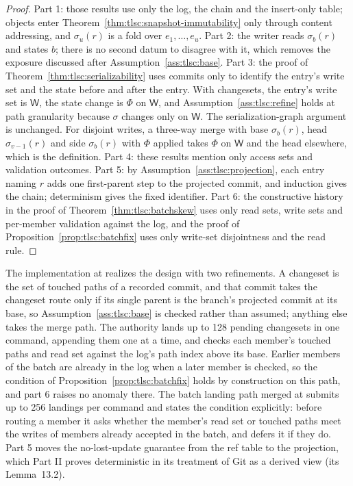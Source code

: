\documentclass[11pt,letterpaper]{article}
\theoremstyle{definition}
\theoremstyle{remark}
\newcommand{\W}{\mathsf{W}}
\begin{document}
\begin{proof}
Part 1: those results use only the log, the chain and the insert-only table; objects enter Theorem~\ref{thm:tlsc:snapshot-immutability} only through content addressing, and $\sigma_u(r)$ is a fold over $e_1,\dots,e_u$. Part 2: the writer reads $\sigma_b(r)$ and states $b$; there is no second datum to disagree with it, which removes the exposure discussed after Assumption~\ref{ass:tlsc:base}. Part 3: the proof of Theorem~\ref{thm:tlsc:serializability} uses commits only to identify the entry's write set and the state before and after the entry. With changesets, the entry's write set is $\W$, the state change is $\Phi$ on $\W$, and Assumption~\ref{ass:tlsc:refine} holds at path granularity because $\sigma$ changes only on $\W$. The serialization-graph argument is unchanged. For disjoint writes, a three-way merge with base $\sigma_b(r)$, head $\sigma_{v-1}(r)$ and side $\sigma_b(r)$ with $\Phi$ applied takes $\Phi$ on $\W$ and the head elsewhere, which is the definition. Part 4: these results mention only access sets and validation outcomes. Part 5: by Assumption~\ref{ass:tlsc:projection}, each entry naming $r$ adds one first-parent step to the projected commit, and induction gives the chain; determinism gives the fixed identifier. Part 6: the constructive history in the proof of Theorem~\ref{thm:tlsc:batchskew} uses only read sets, write sets and per-member validation against the log, and the proof of Proposition~\ref{prop:tlsc:batchfix} uses only write-set disjointness and the read rule.
\end{proof}

The implementation at  realizes the design with two refinements. A changeset is the set of touched paths of a recorded commit, and that commit takes the changeset route only if its single parent is the branch's projected commit at its base, so Assumption~\ref{ass:tlsc:base} is checked rather than assumed; anything else takes the merge path. The authority lands up to 128 pending changesets in one command, appending them one at a time, and checks each member's touched paths and read set against the log's path index above its base. %
Earlier members of the batch are already in the log when a later member is checked, so the condition of Proposition~\ref{prop:tlsc:batchfix} holds by construction on this path, and part 6 raises no anomaly there. The batch landing path merged at  submits up to 256 landings per command and states the condition explicitly: before routing a member it asks whether the member's read set or touched paths meet the writes of members already accepted in the batch, and defers it if they do. %
Part 5 moves the no-lost-update guarantee from the ref table to the projection, which Part II proves deterministic in its treatment of Git as a derived view (its Lemma~13.2).
\end{document}
